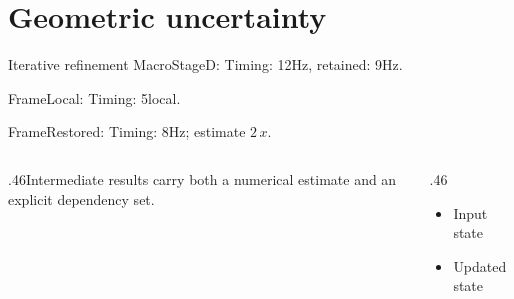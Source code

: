 \documentclass[9pt,aspectratio=43]{beamer}
\newcommand{\fuzzlayerA}[1]{\textrm{#1}}
\newcommand{\fuzzlayerB}[1]{\fuzzlayerA{#1}}
\newcommand{\fuzzlayerC}[1]{\fuzzlayerB{#1}}
\newcommand{\fuzzterm}[1]{\fuzzlayerC{#1}}
\newcommand{\fuzzpair}[2]{\fuzzterm{#1}: #2}
\newcommand{\fuzzunit}{Hz}
\let\fuzzoriginalunit\fuzzunit
\newcommand{\fuzzcoefficient}{2}
\newcommand{\fuzzscale}[2][\fuzzcoefficient]{#1\,#2}
\begin{document}
\section{Geometric uncertainty}
\begin{frame}[t]{Iterative refinement}
\fuzzpair{MacroStageD}{Timing: 12\fuzzunit, retained: 9\fuzzoriginalunit.}\par
{\renewcommand{\fuzzunit}{local}\fuzzpair{FrameLocal}{Timing: 5\fuzzunit.}\par}
\fuzzpair{FrameRestored}{Timing: 8\fuzzunit; estimate $\fuzzscale{x}$.}\par
\begin{columns}[T]\begin{column}{.46\textwidth}Intermediate results carry both a numerical estimate and an explicit dependency set.\end{column}\begin{column}{.46\textwidth}\begin{itemize}\item Input state\item Updated state\end{itemize}\end{column}\end{columns}
\end{frame}
\end{document}
